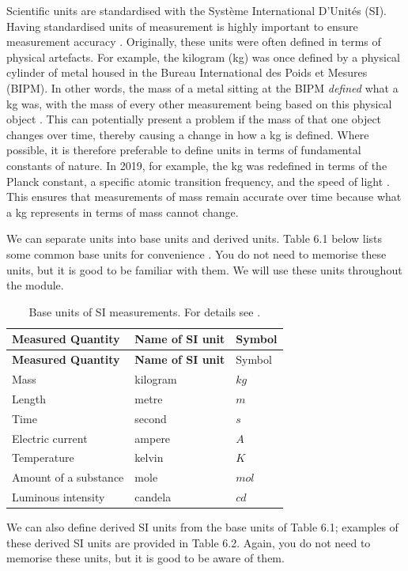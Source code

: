 \documentclass[
]{scrbook}
\begin{document}
Scientific units are standardised with the Système International D'Unités (SI).
Having standardised units of measurement is highly important to ensure measurement accuracy \citep{Quinn1995}.
Originally, these units were often defined in terms of physical artefacts.
For example, the kilogram (kg) was once defined by a physical cylinder of metal housed in the Bureau International des Poids et Mesures (BIPM).
In other words, the mass of a metal sitting at the BIPM \emph{defined} what a kg was, with the mass of every other measurement being based on this physical object \citep{Quinn1995}.
This can potentially present a problem if the mass of that one object changes over time, thereby causing a change in how a kg is defined.
Where possible, it is therefore preferable to define units in terms of fundamental constants of nature.
In 2019, for example, the kg was redefined in terms of the Planck constant, a specific atomic transition frequency, and the speed of light \citep{Stock2019}.
This ensures that measurements of mass remain accurate over time because what a kg represents in terms of mass cannot change.

We can separate units into base units and derived units.
Table 6.1 below lists some common base units for convenience \citep{Quinn1995}.
You do not need to memorise these units, but it is good to be familiar with them.
We will use these units throughout the module.

\begin{longtable}[]{@{}lll@{}}
\caption{Base units of SI measurements. For details see \citet{Quinn1995}.}\tabularnewline
\toprule
\textbf{Measured Quantity} & \textbf{Name of SI unit} & Symbol \\
\midrule
\endfirsthead
\toprule
\textbf{Measured Quantity} & \textbf{Name of SI unit} & Symbol \\
\midrule
\endhead
Mass & kilogram & \(kg\) \\
Length & metre & \(m\) \\
Time & second & \(s\) \\
Electric current & ampere & \(A\) \\
Temperature & kelvin & \(K\) \\
Amount of a substance & mole & \(mol\) \\
Luminous intensity & candela & \(cd\) \\
\bottomrule
\end{longtable}

We can also define derived SI units from the base units of Table 6.1; examples of these derived SI units are provided in Table 6.2.
Again, you do not need to memorise these units, but it is good to be aware of them.
\end{document}
